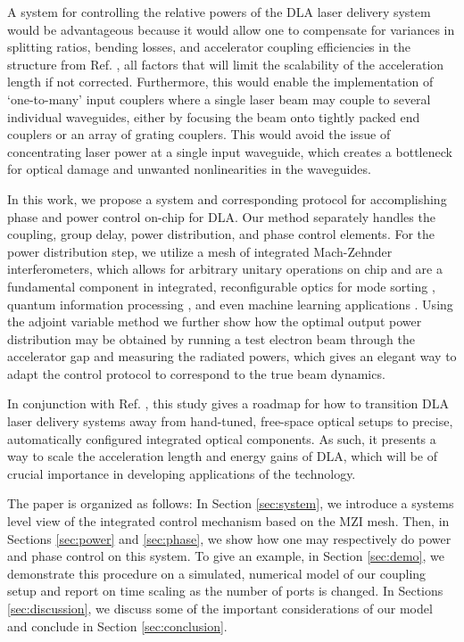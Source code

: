 \documentclass[%
 reprint,
 amsmath,amssymb,
 aps,
prstab,
floatfix,
]{revtex4-1}
\begin{document}
A system for controlling the relative powers of the DLA laser delivery system would be advantageous because it would allow one to compensate for variances in splitting ratios, bending losses, and accelerator coupling efficiencies in the structure from Ref. \cite{hughes_-chip_2017}, all factors that will limit the scalability of the acceleration length if not corrected.  Furthermore, this would enable the implementation of `one-to-many' input couplers where a single laser beam may couple to several individual waveguides, either by focusing the beam onto tightly packed end couplers or an array of grating couplers.  This would avoid the issue of concentrating laser power at a single input waveguide, which creates a bottleneck for optical damage and unwanted nonlinearities in the waveguides.  

In this work, we propose a system and corresponding protocol for accomplishing phase and power control on-chip for DLA.   Our method separately handles the coupling, group delay, power distribution, and phase control elements.  For the power distribution step, we utilize a mesh of integrated Mach-Zehnder interferometers, which allows for arbitrary unitary operations on chip \cite{miller_self-configuring_2013,miller_perfect_2015} and are a fundamental component in integrated, reconfigurable optics for mode sorting \cite{miller_sorting_2015,annoni_unscrambling_2017,miller_setting_2017,miller_self-configuring_2018}, quantum information processing \cite{harris_quantum_2017,metcalf_multiphoton_2013,aspuru-guzik_photonic_2012,obrien_photonic_2009}, and even machine learning applications \cite{shen_deep_2017, hughes_2018_training}.  Using the adjoint variable method \cite{lalau-keraly_adjoint_2013,veronis_method_2004,andkjaer_topology_2011, hughes_method_2017} we further show how the optimal output power distribution may be obtained by running a test electron beam through the accelerator gap and measuring the radiated powers, which gives an elegant way to adapt the control protocol to correspond to the true beam dynamics.

In conjunction with Ref. \cite{hughes_-chip_2017}, this study gives a roadmap for how to transition DLA laser delivery systems away from hand-tuned, free-space optical setups to precise, automatically configured integrated optical components.  As such, it presents a way to scale the acceleration length and energy gains of DLA, which will be of crucial importance in developing applications of the technology.

The paper is organized as follows: In Section \ref{sec:system}, we introduce a systems level view of the integrated control mechanism based on the MZI mesh.  Then, in Sections \ref{sec:power} and \ref{sec:phase}, we show how one may respectively do power and phase control on this system.  To give an example, in Section \ref{sec:demo}, we demonstrate this procedure on a simulated, numerical model of our coupling setup and report on time scaling as the number of ports is changed.  In Sections \ref{sec:discussion}, we discuss some of the important considerations of our model and conclude in Section \ref{sec:conclusion}.
\end{document}
